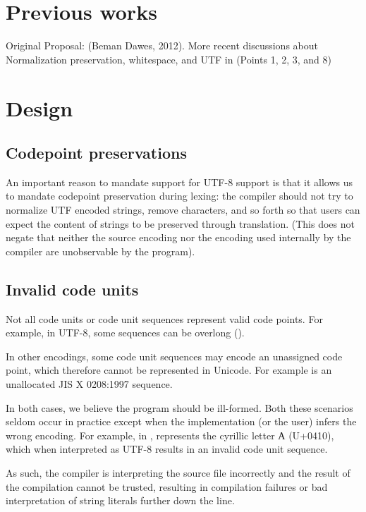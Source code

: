 \documentclass{wg21}
\begin{document}
\section{Previous works}

Original Proposal:  (Beman Dawes, 2012).
More recent discussions about Normalization preservation, whitespace, and UTF in  (Points 1, 2, 3, and 8)

\section{Design}

\subsection{Codepoint preservations}

An important reason to mandate support for UTF-8 support is that it allows us to mandate codepoint preservation during lexing:
the compiler should not try to normalize UTF encoded strings, remove characters, and so forth so that users can expect the content
of strings to be preserved through translation.
(This does not negate that neither the source encoding nor the encoding used internally by the compiler are unobservable by the program).

\subsection{Invalid code units}

Not all code units or code unit sequences represent valid code points.
For example, in UTF-8, some sequences can be overlong ().

In other encodings, some code unit sequences may encode an unassigned code point, which therefore cannot be represented in Unicode.
For example  is an unallocated JIS X 0208:1997 sequence.

In both cases, we believe the program should be ill-formed.
Both these scenarios seldom occur in practice except when the implementation (or the user) infers the wrong encoding.
For example, in ,  represents the cyrillic letter А (U+0410), which when interpreted
as UTF-8 results in an invalid code unit sequence.

As such, the compiler is interpreting the source file incorrectly and the result of the compilation cannot be trusted,
resulting in compilation failures or bad interpretation of string literals further down the line.
\end{document}
